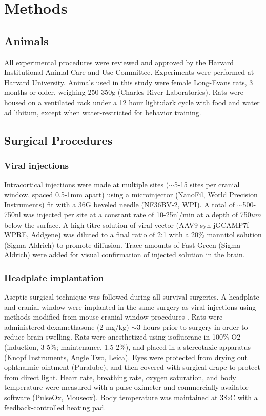 \chapter{Methods}
\label{methods}

\section{Animals}
All experimental procedures were reviewed and approved by the Harvard Institutional Animal Care and Use Committee. Experiments were performed at Harvard University. Animals used in this study were female Long-Evans rats, 3 months or older, weighing 250-350g (Charles River Laboratories). Rats were housed on a ventilated rack under a 12 hour light:dark cycle with food and water ad libitum, except when water-restricted for behavior training. 

\section{Surgical Procedures}
\subsection{Viral injections}
Intracortical injections were made at multiple sites ($\sim$5-15 sites per cranial window, spaced 0.5-1mm apart) using a microinjector (NanoFil, World Precision Instruments) fit with a 36G beveled needle (NF36BV-2, WPI). A total of $\sim$500-750nl was injected per site at a constant rate of 10-25nl/min at a depth of 750$um$ below the surface. A high-titre solution of viral vector (AAV9-syn-jGCAMP7f-WPRE, Addgene) was diluted to a final ratio of 2:1 with a 20\% mannitol solution (Sigma-Aldrich) to promote diffusion. Trace amounts of Fast-Green (Sigma-Aldrich) were added for visual confirmation of injected solution in the brain.

\subsection{Headplate implantation}
Aseptic surgical technique was followed during all survival surgeries. A headplate and cranial window were implanted in the same surgery as viral injections using methods modified from mouse cranial window procedures \cite{Goldey2014}. Rats were administered dexamethasone (2 mg/kg) $\sim$3 hours prior to surgery in order to reduce brain swelling. Rats were anesthetized using isofluorane in 100\% O2 (induction, 3-5\%; maintenance, 1.5-2\%), and placed in a stereotaxic apparatus (Knopf Instruments, Angle Two, Leica). Eyes were protected from drying out ophthalmic ointment (Puralube), and then covered with surgical drape to protect from direct light. Heart rate, breathing rate, oxygen saturation, and body temperature were measured with a pulse oximeter and commercially available software (PulseOx, Mouseox). Body temperature was maintained at 38$\circ$C with a feedback-controlled heating pad. 

